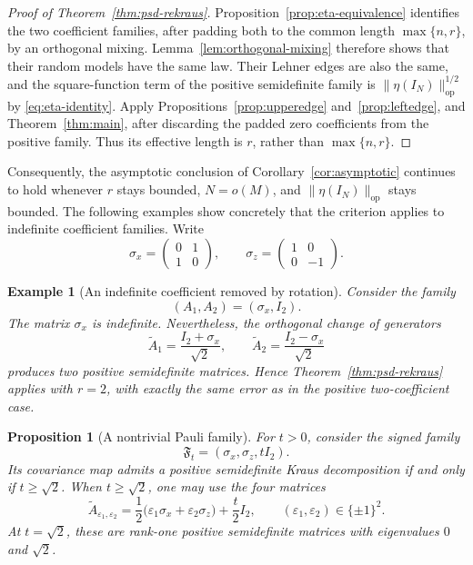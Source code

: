 \documentclass{article}
\newtheorem{proposition}[theorem]{Proposition}
\newtheorem{example}[theorem]{Example}
\newcommand{\op}{\mathrm{op}}
\begin{document}
\psdrekrausthm

\begin{proof}[Proof of Theorem~\ref{thm:psd-rekraus}]
	Proposition~\ref{prop:eta-equivalence} identifies the two coefficient
	families, after padding both to the common length \(\max\{n,r\}\), by an
	orthogonal mixing.
	Lemma~\ref{lem:orthogonal-mixing} therefore shows that their random models
	have the same law.  Their Lehner edges are also the same, and the
	square-function term of the positive semidefinite family is
	$\|\eta(I_N)\|_{\op}^{1/2}$ by \eqref{eq:eta-identity}.  Apply
	Propositions~\ref{prop:upperedge} and~\ref{prop:leftedge}, and
	Theorem~\ref{thm:main}, after discarding the padded zero coefficients from
	the positive family.  Thus its effective length is \(r\), rather than
	\(\max\{n,r\}\).
\end{proof}

Consequently, the asymptotic conclusion of Corollary~\ref{cor:asymptotic}
continues to hold whenever $r$ stays bounded, $N=o(M)$, and
$\|\eta(I_N)\|_{\op}$ stays bounded.  The following examples show concretely
that the criterion applies to indefinite coefficient families.  Write
\[
	\sigma_x=\begin{pmatrix}0&1\\1&0\end{pmatrix},
	\qquad
	\sigma_z=\begin{pmatrix}1&0\\0&-1\end{pmatrix}.
\]

\begin{example}[An indefinite coefficient removed by rotation]
	\label{ex:pauli-pair}
	Consider the family
	\[
		(A_1,A_2)=(\sigma_x,I_2).
	\]
	The matrix $\sigma_x$ is indefinite.  Nevertheless, the orthogonal change of
	generators
	\[
		\widetilde A_1=\frac{I_2+\sigma_x}{\sqrt2},
		\qquad
		\widetilde A_2=\frac{I_2-\sigma_x}{\sqrt2}
	\]
	produces two positive semidefinite matrices.  Hence
	Theorem~\ref{thm:psd-rekraus} applies with $r=2$, with exactly the same error
	as in the positive two-coefficient case.
\end{example}

\begin{proposition}[A nontrivial Pauli family]
	\label{prop:pauli-threshold}
	For $t>0$, consider the signed family
	\[
		\mathfrak F_t=(\sigma_x,\sigma_z,tI_2).
	\]
	Its covariance map admits a positive semidefinite Kraus decomposition if and
	only if $t\ge\sqrt2$.  When $t\ge\sqrt2$, one may use the four matrices
	\[
		\widetilde A_{\varepsilon_1,\varepsilon_2}
		=
		\frac12\bigl(\varepsilon_1\sigma_x+\varepsilon_2\sigma_z\bigr)
		+\frac t2I_2,
		\qquad
		(\varepsilon_1,\varepsilon_2)\in\{\pm1\}^2.
	\]
	At $t=\sqrt2$, these are rank-one positive semidefinite matrices with
	eigenvalues $0$ and $\sqrt2$.
\end{proposition}
\end{document}
